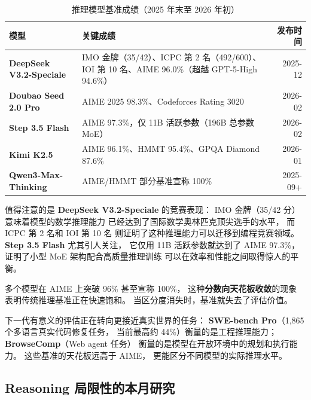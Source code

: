 \begin{table}[H]
\centering\small
\renewcommand{\arraystretch}{1.3}
\caption{推理模型基准成绩（2025 年末至 2026 年初）}\label{tab:reasoning-benchmarks}
\begin{tabularx}{\linewidth}{l X r}
\toprule
\rowcolor{figLightGray}
\textbf{模型} & \textbf{关键成绩} & \textbf{发布时间} \\
\midrule
\textbf{DeepSeek V3.2-Speciale} &
  IMO 金牌（35/42）、ICPC 第 2 名（492/600）、IOI 第 10 名、AIME 96.0\%（超越 GPT-5-High 94.6\%） &
  2025-12 \\
\textbf{Doubao Seed 2.0 Pro} &
  AIME 2025 98.3\%、Codeforces Rating 3020 &
  2026-02 \\
\textbf{Step 3.5 Flash} &
  AIME 97.3\%，仅 11B 活跃参数（196B 总参数 MoE） &
  2026-02 \\
\textbf{Kimi K2.5} &
  AIME 96.1\%、HMMT 95.4\%、GPQA Diamond 87.6\% &
  2026-01 \\
\textbf{Qwen3-Max-Thinking} &
  AIME/HMMT 部分基准宣称 100\% &
  2025-09+ \\
\bottomrule
\end{tabularx}
\end{table}

值得注意的是 \textbf{DeepSeek V3.2-Speciale} 的竞赛表现：
IMO 金牌（35/42 分）意味着模型的数学推理能力
已经达到了国际数学奥林匹克顶尖选手的水平，
而 ICPC 第 2 名和 IOI 第 10 名
则证明了这种推理能力可以迁移到编程竞赛领域。
\textbf{Step 3.5 Flash} 尤其引人关注，
它仅用 11B 活跃参数就达到了 AIME 97.3\%，
证明了小型 MoE 架构配合高质量推理训练
可以在效率和性能之间取得惊人的平衡。

\begin{warnbox}[基准饱和与评估范式转移]
多个模型在 AIME 上突破 96\% 甚至宣称 100\%，
这种\textbf{分数向天花板收敛}的现象
表明传统推理基准正在快速饱和。
当区分度消失时，基准就失去了评估价值。

下一代有意义的评估正在转向更接近真实世界的任务：
\textbf{SWE-bench Pro}（1,865 个多语言真实代码修复任务，
当前最高约 44\%）衡量的是工程推理能力；
\textbf{BrowseComp}（Web agent 任务）
衡量的是模型在开放环境中的规划和执行能力。
这些基准的天花板远高于 AIME，
更能区分不同模型的实际推理水平。
\end{warnbox}

\subsection{Reasoning 局限性的本月研究}
\label{sec:reasoning-limits-2026}

